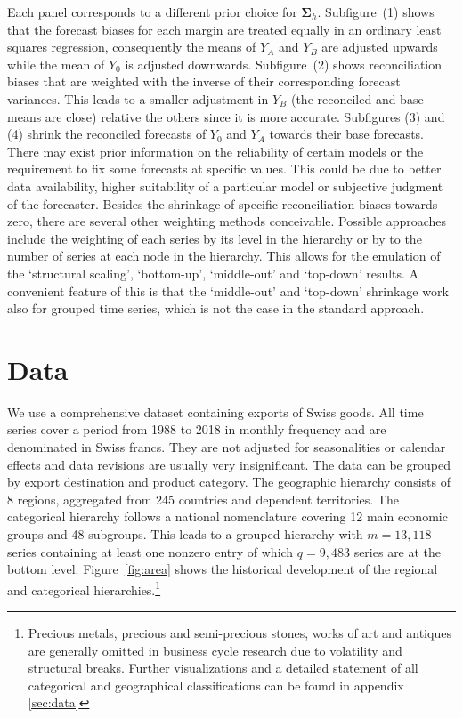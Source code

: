 \documentclass[a4paper,fleqn,11pt]{article}
\begin{document}
Each panel corresponds to a different prior choice for $\boldsymbol{\Sigma}_h$. Subfigure~(1) shows that the forecast biases for each margin are treated equally in an ordinary least squares regression, consequently the means of $Y_A$ and $Y_B$ are adjusted upwards while the mean of $Y_0$ is adjusted downwards. Subfigure~(2) shows reconciliation biases that are weighted with the inverse of their corresponding forecast variances. This leads to a smaller adjustment in $Y_B$ (the reconciled and base means are close) relative the others since it is more accurate. Subfigures (3) and (4) shrink the reconciled forecasts of $Y_0$ and $Y_A$ towards their base forecasts. There may exist prior information on the reliability of certain models or the requirement to fix some forecasts at specific values. This could be due to better data availability, higher suitability of a particular model or subjective judgment of the forecaster. Besides the shrinkage of specific reconciliation biases towards zero, there are several other weighting methods conceivable. Possible approaches include the weighting of each series by its level in the hierarchy or by to the number of series at each node in the hierarchy. This allows for the emulation of the `structural scaling', `bottom-up', `middle-out' and `top-down' results. A convenient feature of this is that the `middle-out' and `top-down' shrinkage work also for grouped time series, which is not the case in the standard approach.


\section{Data}\label{sec:datadesc}

We use a comprehensive dataset containing exports of Swiss goods. All time series cover a period from 1988 to 2018 in monthly frequency and are denominated in Swiss francs. They are not adjusted for seasonalities or calendar effects and data revisions are usually very insignificant. The data can be grouped by export destination and product category. The geographic hierarchy consists of 8 regions, aggregated from 245 countries and dependent territories. The categorical hierarchy follows a national nomenclature covering 12 main economic groups and 48 subgroups. This leads to a grouped hierarchy with $m = 13,118$ series containing at least one nonzero entry of which $q = 9,483$ series are at the bottom level. Figure~\ref{fig:area} shows the historical development of the regional and categorical hierarchies.\footnote{Precious metals, precious and semi-precious stones, works of art and antiques are generally omitted in business cycle research due to volatility and structural breaks. Further visualizations and a detailed statement of all categorical and geographical classifications can be found in appendix \ref{sec:data}}
\end{document}
